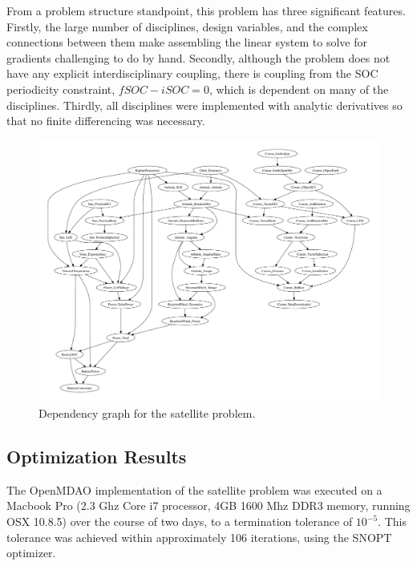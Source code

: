 \documentclass[]{aiaa-tc} %
\begin{document}
    From a problem structure standpoint, this problem has three significant features. Firstly, the large number of 
    disciplines, design variables, and the complex connections between them make assembling the linear system to solve for gradients 
    challenging to do by hand. Secondly, although the problem does not have any explicit interdisciplinary coupling, 
    there is coupling from the SOC periodicity constraint, $fSOC - iSOC = 0$, which is dependent on many of the 
    disciplines. Thirdly, all disciplines were implemented with analytic derivatives so that no finite differencing was 
    necessary. 

    \begin{figure}[!htb]\begin{center}
      \includegraphics[width=1.1\textwidth]{images/CADRE.pdf}
      \caption{ Dependency graph for the satellite problem. \label{fig:cadre_graph}}
    \end{center}\end{figure}

    \subsection{Optimization Results}

        The OpenMDAO implementation of the satellite problem was executed on a
        Macbook Pro (2.3 Ghz Core i7 processor, 4GB 1600 Mhz DDR3 memory, running OSX 10.8.5)
        over the course of two days, to a termination tolerance of $10^{-5}$. This tolerance
        was achieved within approximately 106 iterations, using the SNOPT\cite{gill2005snopt}
        optimizer.
\end{document}
